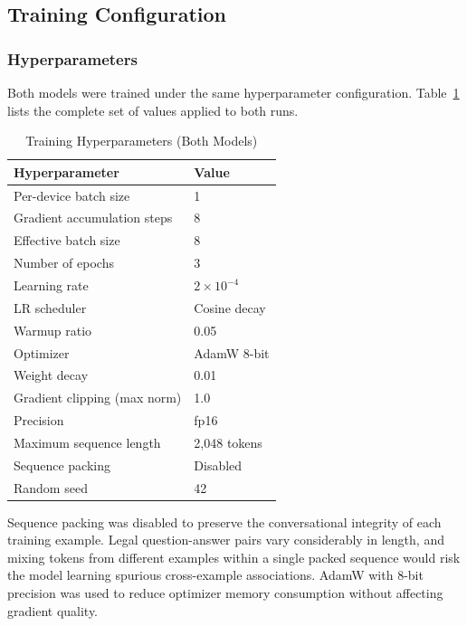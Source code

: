 \subsection{Training Configuration}
\label{sec:training-configuration}

\subsubsection{Hyperparameters}

Both models were trained under the same hyperparameter configuration. Table~\ref{tab:training-hyperparams} lists the complete set of values applied to both runs.

\begin{table}[H]
\centering
\caption{Training Hyperparameters (Both Models)}
\label{tab:training-hyperparams}
\renewcommand{\arraystretch}{1.3}
\begin{tabular}{|p{5.5cm}|p{7cm}|}
\hline
\textbf{Hyperparameter} & \textbf{Value} \\
\hline
Per-device batch size & 1 \\
\hline
Gradient accumulation steps & 8 \\
\hline
Effective batch size & 8 \\
\hline
Number of epochs & 3 \\
\hline
Learning rate & $2 \times 10^{-4}$ \\
\hline
LR scheduler & Cosine decay \\
\hline
Warmup ratio & 0.05 \\
\hline
Optimizer & AdamW 8-bit \\
\hline
Weight decay & 0.01 \\
\hline
Gradient clipping (max norm) & 1.0 \\
\hline
Precision & fp16 \\
\hline
Maximum sequence length & 2,048 tokens \\
\hline
Sequence packing & Disabled \\
\hline
Random seed & 42 \\
\hline
\end{tabular}
\end{table}

Sequence packing was disabled to preserve the conversational integrity of each training example. Legal question-answer pairs vary considerably in length, and mixing tokens from different examples within a single packed sequence would risk the model learning spurious cross-example associations. AdamW with 8-bit precision was used to reduce optimizer memory consumption without affecting gradient quality.

